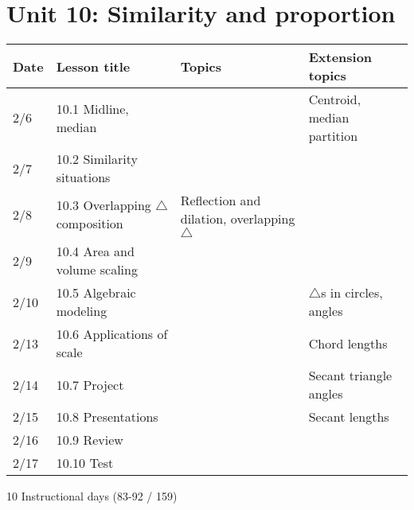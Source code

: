 \section*{Unit 10: Similarity and proportion}
\begin{tabular}{|p{0.9cm}|p{4cm}|p{7cm}|p{5cm}|}
  \hline
  Date & Lesson title & Topics  & Extension topics \\
  \hline
  2/6 & 10.1 Midline, median &  & Centroid, median partition \\
  \hline
  2/7 & 10.2 Similarity situations &  &  \\
  \hline
  2/8 & 10.3 Overlapping $\triangle$ composition & Reflection and dilation, overlapping  $\triangle$ &  \\
  \hline
  2/9 & 10.4 Area and volume scaling &  &  \\
  \hline
  2/10 & 10.5 Algebraic modeling &  & $\triangle$s in circles, angles \\
  \hline
  2/13 & 10.6 Applications of scale &  & Chord lengths \\
  \hline
  2/14 & 10.7 Project &  & Secant triangle angles \\
  \hline
  2/15 & 10.8 Presentations &  & Secant lengths \\
  \hline
  2/16 & 10.9 Review &  &  \\
  \hline
  2/17 & 10.10 Test &  &  \\
  \hline

\end{tabular} \par \vspace*{0.3cm}
10 Instructional days (83-92 / 159)


